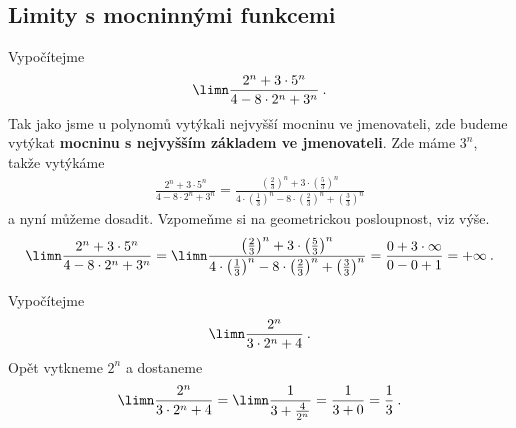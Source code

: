 \subsection*{Limity s mocninnými funkcemi}

\begin{example}
    Vypočítejme
    \begin{align}
        \limn \frac{2^n+3 \cdot 5^n}{4 - 8\cdot 2^n +3^n} \:.
    \end{align}
    Tak jako jsme u polynomů vytýkali nejvyšší mocninu ve jmenovateli, zde budeme vytýkat \textbf{mocninu s nejvyšším základem ve jmenovateli}. Zde máme $3^n$, takže vytýkáme
    \begin{align}
        \frac{2^n+3 \cdot 5^n}{4 - 8\cdot 2^n +3^n} 
        =
         \frac{
             \left( \frac{2}{3} \right)^n 
             + 3 \cdot \left(\frac{5}{3} \right)^n
             }
         {
              4 \cdot \left(\frac{1}{3} \right)^n
            - 8 \cdot \left( \frac{2}{3}\right)^n 
            + \left( \frac{3}{3} \right)^n} 
    \end{align}
    a nyní můžeme dosadit. Vzpomeňme si na geometrickou posloupnost, viz výše.
    \begin{align}
        \limn \frac{2^n+3 \cdot 5^n}{4 - 8\cdot 2^n +3^n} =
        \limn
        \frac{
            \left( \frac{2}{3} \right)^n 
            + 3 \cdot \left(\frac{5}{3} \right)^n
            }
        {
            4 \cdot \left( \frac{1}{3} \right)^n
           - 8 \cdot \left( \frac{2}{3}\right)^n 
           + \left( \frac{3}{3} \right)^n} 
        =
        \frac{0+3 \cdot \infty}{0 - 0 + 1} = + \infty \:.
    \end{align}
\end{example}

\begin{example}
    Vypočítejme
    \begin{align}
        \limn  \frac{2^n}{3 \cdot 2^n + 4}  \:.
    \end{align}
    Opět vytkneme $2^n$ a dostaneme
    \begin{align}
        \limn \frac{2^n}{3 \cdot 2^n + 4} = \limn \frac{1}{3 + \frac{4}{2^n}} = \frac{1}{3 + 0} = \frac{1}{3} \:.
    \end{align}
\end{example}

